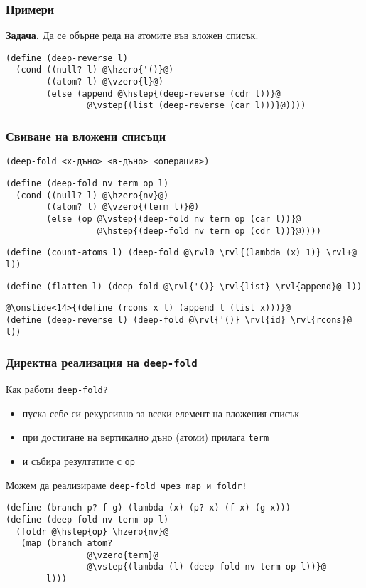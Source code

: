 \documentclass{beamer}
\begin{document}
\begin{frame}[fragile]
  \frametitle{Примери}

  \textbf{Задача.} Да се обърне реда на атомите във вложен списък.\\
  \pause
\begin{lstlisting}
(define (deep-reverse l)
  (cond ((null? l) @\hzero{'()}@)
        ((atom? l) @\vzero{l}@)
        (else (append @\hstep{(deep-reverse (cdr l))}@
                @\vstep{(list (deep-reverse (car l)))}@))))
\end{lstlisting}
\end{frame}

\begin{frame}[fragile]
  \frametitle{Свиване на вложени списъци}

  \tt{(deep-fold }<х-дъно> <в-дъно> <операция>\tt)\\
  \pause
  \onslide<+->
\begin{lstlisting}
(define (deep-fold nv term op l)
  (cond ((null? l) @\hzero{nv}@)
        ((atom? l) @\vzero{(term l)}@)
        (else (op @\vstep{(deep-fold nv term op (car l))}@
                  @\hstep{(deep-fold nv term op (cdr l))}@))))
\end{lstlisting}
  \onslide<+->
\begin{lstlisting}
(define (count-atoms l) (deep-fold @\rvl0 \rvl{(lambda (x) 1)} \rvl+@ l))
\end{lstlisting}
  \onslide<+->
\begin{lstlisting}
(define (flatten l) (deep-fold @\rvl{'()} \rvl{list} \rvl{append}@ l))
\end{lstlisting}
  \onslide<+->
\begin{lstlisting}
@\onslide<14>{(define (rcons x l) (append l (list x)))}@
(define (deep-reverse l) (deep-fold @\rvl{'()} \rvl{id} \rvl{rcons}@ l))
\end{lstlisting}
\end{frame}

\begin{frame}[fragile]
  \frametitle{Директна реализация на \tt{deep-fold}}

  Как работи \tt{deep-fold}?
  \pause
  \begin{itemize}[<+->]
  \item пуска себе си рекурсивно за всеки елемент на вложения списък
  \item при достигане на вертикално дъно (атоми) прилага \tt{term}
  \item и събира резултатите с \tt{op}
  \end{itemize}
  \onslide<+->
  Можем да реализираме \tt{deep-fold} чрез \tt{map} и \tt{foldr}!
  \onslide<+->
\begin{lstlisting}
(define (branch p? f g) (lambda (x) (p? x) (f x) (g x)))
(define (deep-fold nv term op l)
  (foldr @\hstep{op} \hzero{nv}@
   (map (branch atom?
                @\vzero{term}@
                @\vstep{(lambda (l) (deep-fold nv term op l))}@
        l)))
\end{lstlisting}
\end{frame}
\end{document}
